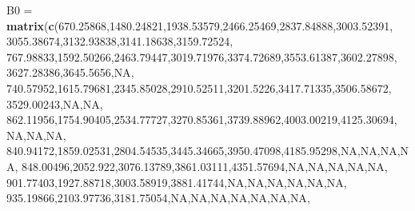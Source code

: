 \documentclass[]{article}
\newenvironment{Shaded}{\begin{snugshade}}{\end{snugshade}}
\newcommand{\FloatTok}[1]{\textcolor[rgb]{0.00,0.00,0.81}{#1}}
\newcommand{\KeywordTok}[1]{\textcolor[rgb]{0.13,0.29,0.53}{\textbf{#1}}}
\newcommand{\NormalTok}[1]{#1}
\newcommand{\OtherTok}[1]{\textcolor[rgb]{0.56,0.35,0.01}{#1}}
\newcommand{\StringTok}[1]{\textcolor[rgb]{0.31,0.60,0.02}{#1}}
\begin{document}
\begin{Shaded}
\begin{Highlighting}[]
\NormalTok{B0 =}\StringTok{ }\KeywordTok{matrix}\NormalTok{(}\KeywordTok{c}\NormalTok{(}\FloatTok{670.25868}\NormalTok{,}\FloatTok{1480.24821}\NormalTok{,}\FloatTok{1938.53579}\NormalTok{,}\FloatTok{2466.25469}\NormalTok{,}\FloatTok{2837.84888}\NormalTok{,}\FloatTok{3003.52391}\NormalTok{,}
            \FloatTok{3055.38674}\NormalTok{,}\FloatTok{3132.93838}\NormalTok{,}\FloatTok{3141.18638}\NormalTok{,}\FloatTok{3159.72524}\NormalTok{,}
            \FloatTok{767.98833}\NormalTok{,}\FloatTok{1592.50266}\NormalTok{,}\FloatTok{2463.79447}\NormalTok{,}\FloatTok{3019.71976}\NormalTok{,}\FloatTok{3374.72689}\NormalTok{,}\FloatTok{3553.61387}\NormalTok{,}\FloatTok{3602.27898}\NormalTok{,}
            \FloatTok{3627.28386}\NormalTok{,}\FloatTok{3645.5656}\NormalTok{,}\OtherTok{NA}\NormalTok{,}
            \FloatTok{740.57952}\NormalTok{,}\FloatTok{1615.79681}\NormalTok{,}\FloatTok{2345.85028}\NormalTok{,}\FloatTok{2910.52511}\NormalTok{,}\FloatTok{3201.5226}\NormalTok{,}\FloatTok{3417.71335}\NormalTok{,}\FloatTok{3506.58672}\NormalTok{,}
            \FloatTok{3529.00243}\NormalTok{,}\OtherTok{NA}\NormalTok{,}\OtherTok{NA}\NormalTok{,}
            \FloatTok{862.11956}\NormalTok{,}\FloatTok{1754.90405}\NormalTok{,}\FloatTok{2534.77727}\NormalTok{,}\FloatTok{3270.85361}\NormalTok{,}\FloatTok{3739.88962}\NormalTok{,}\FloatTok{4003.00219}\NormalTok{,}\FloatTok{4125.30694}\NormalTok{,}
            \OtherTok{NA}\NormalTok{,}\OtherTok{NA}\NormalTok{,}\OtherTok{NA}\NormalTok{,}
            \FloatTok{840.94172}\NormalTok{,}\FloatTok{1859.02531}\NormalTok{,}\FloatTok{2804.54535}\NormalTok{,}\FloatTok{3445.34665}\NormalTok{,}\FloatTok{3950.47098}\NormalTok{,}\FloatTok{4185.95298}\NormalTok{,}\OtherTok{NA}\NormalTok{,}\OtherTok{NA}\NormalTok{,}\OtherTok{NA}\NormalTok{,}\OtherTok{NA}\NormalTok{,}
            \FloatTok{848.00496}\NormalTok{,}\FloatTok{2052.922}\NormalTok{,}\FloatTok{3076.13789}\NormalTok{,}\FloatTok{3861.03111}\NormalTok{,}\FloatTok{4351.57694}\NormalTok{,}\OtherTok{NA}\NormalTok{,}\OtherTok{NA}\NormalTok{,}\OtherTok{NA}\NormalTok{,}\OtherTok{NA}\NormalTok{,}\OtherTok{NA}\NormalTok{,}
            \FloatTok{901.77403}\NormalTok{,}\FloatTok{1927.88718}\NormalTok{,}\FloatTok{3003.58919}\NormalTok{,}\FloatTok{3881.41744}\NormalTok{,}\OtherTok{NA}\NormalTok{,}\OtherTok{NA}\NormalTok{,}\OtherTok{NA}\NormalTok{,}\OtherTok{NA}\NormalTok{,}\OtherTok{NA}\NormalTok{,}\OtherTok{NA}\NormalTok{,}
            \FloatTok{935.19866}\NormalTok{,}\FloatTok{2103.97736}\NormalTok{,}\FloatTok{3181.75054}\NormalTok{,}\OtherTok{NA}\NormalTok{,}\OtherTok{NA}\NormalTok{,}\OtherTok{NA}\NormalTok{,}\OtherTok{NA}\NormalTok{,}\OtherTok{NA}\NormalTok{,}\OtherTok{NA}\NormalTok{,}\OtherTok{NA}\NormalTok{,}

\end{Highlighting}
\end{Shaded}
\end{document}
